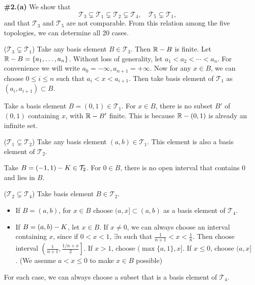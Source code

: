 \documentclass[a4paper,11pt]{article}
\newcommand{\T}{\mathcal{T}}
\begin{document}
\begin{minipage}[t][270mm]{90mm}
    {\bfseries \large \#2.(a)} We show that
    \[
        \T_3 \subsetneq \T_1 \subsetneq \T_2 \subsetneq \T_4, \quad \T_5 \subsetneq \T_1,
    \]
    and that \(\T_3\) and \(\T_5\) are not comparable. From this relation among the five topologies, we can determine all 20 cases.

    \bigskip

    (\(\T_3 \subsetneq \T_1\)) Take any basis element \(B \in \T_3\). Then \(\mathbb{R} - B\) is finite. Let \(\mathbb{R} - B = \{a_1, \dots, a_n\}\). Without loss of generality, let \(a_1 < a_2 < \cdots < a_n\). For convenience we will write \(a_0 = -\infty, a_{n+1} = +\infty\). Now for any \(x \in B\), we can choose \(0 \leq i \leq n\) such that \(a_i < x < a_{i+1}\). Then take basis element of \(\T_1\) as \((a_i, a_{i+1}) \subset B\).

    \smallskip

    Take a basis element \(B = (0, 1) \in \T_1\). For \(x \in B\), there is no subset \(B'\) of \((0, 1)\) containing \(x\), with \(\mathbb{R} - B'\) finite. This is because \(\mathbb{R} - (0, 1)\) is already an infinite set.

    \bigskip

    (\(\T_1 \subsetneq \T_2\)) Take any basis element \((a, b) \in \T_1\). This element is also a basis element of \(\T_2\).

    \smallskip

    Take \(B = (-1, 1) \bs K \in \T_2\). For \(0 \in B\), there is no open interval that contains \(0\) and lies in \(B\).

    \bigskip

    (\(\T_2 \subsetneq \T_4\)) Take basis element \(B \in \T_2\).
    \begin{itemize}
        \item If \(B = (a, b)\), for \(x \in B\) choose \((a, x] \subset (a, b)\) as a basis element of \(\T_4\).
        \item If \(B = (a, b) - K\), let \(x \in B\). If \(x \neq 0\), we can always choose an interval containing \(x\), since if \(0 < x < 1\), \(\exists n\) such that \(\frac{1}{n+1} < x < \frac{1}{n}\). Then choose interval \(\left(\frac{1}{n+1}, \frac{1/n + x}{2}\right]\). If \(x > 1\), choose \((\max\{a, 1\}, x]\). If \(x \leq 0\), choose \((a, x]\). (We assume \(a < x \leq 0\) to make \(x \in B\) possible)
    \end{itemize}
    For each case, we can always choose a subset that is a basis element of \(\T_4\).


\end{minipage}
\end{document}
